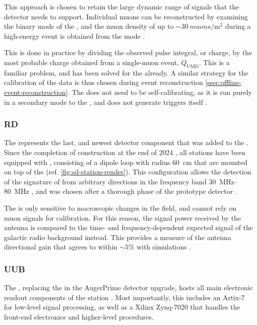 This approach is chosen to retain the large dynamic range of signals that the 
detector needs to support. Individual muons can be reconstructed by examining
the binary mode of the \UMD, and the muon density of up to 
$\sim\SI{30}{muons\per\meter\squared} $ during a high-energy \EAS event is 
obtained from the \ADC mode \cite{bottiStatusPerformanceUnderground2022}.

This is done in practice by dividing the observed pulse integral, or charge, by
the most probable charge obtained from a single-muon event, $Q_\mathrm{UMD}$. 
This is a familiar problem, and has been solved for the \WCD already. A similar
strategy for the calibration of the \UMD \EAS data is thus chosen during event 
reconstruction \cref{ssec:offline-event-reconstruction}. The \UMD does not need 
to be self-calibrating, as it is run purely in a secondary mode to the \WCD, and
does not generate triggers itself \cite{aabCalibrationUndergroundMuon2021}.

\subsubsection{\acf{RD}}

The \RD represents the last, and newest detector component that was added to the
\SD. Since the completion of construction at the end of 2024 
\cite{castellinaSeasonalGreetings202424}, all \SD stations have been equipped
with \SALLAs, consisting of a dipole loop with radius \SI{60}{\centi\meter} that
are mounted on top of the \SSD (ref. \cref{fig:sd-station-render}). This 
configuration allows the detection of the \EM signature of \EASs from arbitrary 
directions in the frequency band 
\SIrange[range-units = single]{30}{80}{\mega\hertz} 
\cite{pontLargeRadioDetector2021}, and was chosen after a thorough \RND phase of
the \AERA prototype detector \cite{aabPierreAugerObservatory2020, 
fuchsAugerEngineeringRadio2012, aabEnergyEstimationCosmic2016}.

The \RD is only sensitive to macroscopic changes in the \EM field, and cannot 
rely on muon signals for calibration. For this reason, the signal power received
by the antenna is compared to the time- and frequency-dependent expected signal 
of the galactic radio background instead. This provides a measure of the antenna
directional gain that agrees to within $\sim5\%$ with simulations 
\cite{huegeRadioDetectorPierre2023, fodranFirstResultsAugerPrime2022}.

\subsubsection{\acf{UUB}}
The \UUB, replacing the \UB in the AugerPrime detector upgrade, hosts all main 
electronic readout components of the station 
\cite{collaborationPierreAugerObservatory2016}. Most importantly, this includes 
an Artix-7 \FPGA \cite{xilinx7SeriesFPGAs2020} for low-level signal processing,
as well as a Xilinx Zynq-7020 \SOC \cite{amdZynq7000SoC2023} that handles the 
front-end electronics and higher-level procedures.


